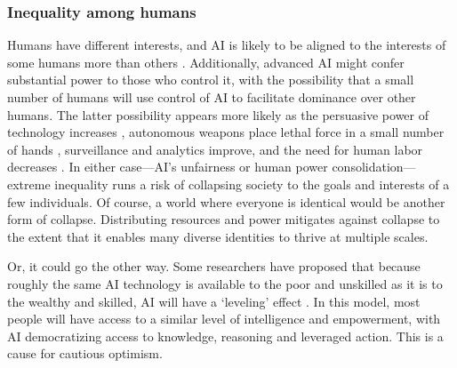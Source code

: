 \documentclass[11pt]{article}
\begin{document}


\subsubsection{Inequality among humans} 

Humans have different interests, and AI is likely to be aligned to the interests of some humans more than others \citep{gabriel2025matter,sorensen2024roadmap,gabriel2020artificial, santurkar2023whose, baum2020social}. Additionally, advanced AI might confer substantial power to those who control it, with the possibility that a small number of humans will use control of AI to facilitate dominance over other humans. The latter possibility appears more likely as the persuasive power of technology increases \citep{woolley2018computational, costello2024durably, hackenburg2025levers}, autonomous weapons place lethal force in a small number of hands \citep{scharre2018army}, surveillance and analytics improve, and the need for human labor decreases \citep{susskind2020world, ford2015rise, drago2025defining}. In either case---AI's unfairness or human power consolidation---extreme inequality runs a risk of collapsing society to the goals and interests of a few individuals. Of course, a world where everyone is identical would be another form of collapse. Distributing resources and power mitigates against collapse to the extent that it enables many diverse identities to thrive at multiple scales.



Or, it could go the other way. Some researchers have proposed that because roughly the same AI technology is available to the poor and unskilled as it is to the wealthy and skilled, AI will have a `leveling' effect \citep{noy2023experimental, brynjolfsson2025generative}. In this model, most people will have access to a similar level of intelligence and empowerment, with AI democratizing access to knowledge, reasoning and leveraged action. This is a cause for cautious optimism.
\end{document}

